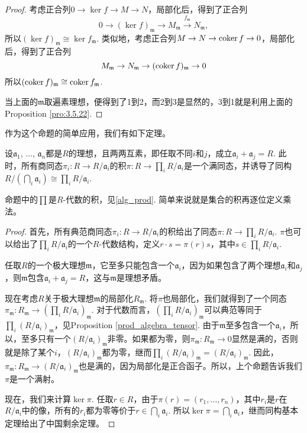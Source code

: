 \begin{proof}
	考虑正合列$0\to \ker f\to M\to N$，局部化后，得到了正合列
	\[
		0\to (\ker f)_{\mathfrak m}\to M_{\mathfrak m}\xrightarrow{f_{\mathfrak m}} N_{\mathfrak m},
	\]
	所以$(\ker f)_{\mathfrak m}\cong \ker f_{\mathfrak m}$. 类似地，考虑正合列$M\to N\to \operatorname{coker} f\to 0$，局部化后，得到了正合列
	\[
		M_{\mathfrak m}\to N_{\mathfrak m}\to (\operatorname{coker} f)_{\mathfrak m}\to 0
	\]
	所以$(\operatorname{coker} f)_{\mathfrak m}\cong \operatorname{coker} f_{\mathfrak m}$.

	当上面的$\mathfrak m$取遍素理想，便得到了1到2，而2到3是显然的，3到1就是利用上面的Proposition \ref{pro:3.5.22}.
\end{proof}

作为这个命题的简单应用，我们有如下定理。

\begin{thm}[中国剩余定理]
	设$\mathfrak a_1$, $\dots$, $\mathfrak a_n$都是$R$的理想，且两两互素，即任取不同$i$和$j$，成立$\mathfrak a_i+\mathfrak a_j=R$. 此时，所有商同态$\pi_i:R\to R/\mathfrak a_i$的积$\pi:R\to \prod_i R/\mathfrak a_i$是一个满同态，并诱导了同构$R/(\bigcap_i \mathfrak a_i)\cong \prod_i R/\mathfrak a_i$.
\end{thm}

命题中的$\prod$是$R$-代数的积，见\ref{alg_prod}. 简单来说就是集合的积再逐位定义乘法。

\begin{proof}
	首先，所有典范商同态$\pi_i:R\to R/\mathfrak a_i$的积给出了同态$\pi:R\to \prod_i R/\mathfrak a_i$. $\pi$也可以给出了$\prod_i R/\mathfrak a_i$的一个$R$-代数结构，定义$r\cdot s=\pi(r)s$，其中$s\in \prod_i R/\mathfrak a_i$. 

	任取$R$的一个极大理想$\mathfrak m$，它至多只能包含一个$\mathfrak a_i$，因为如果包含了两个理想$\mathfrak a_i$和$\mathfrak a_j$，则$\mathfrak m$包含$\mathfrak a_i+\mathfrak a_j=R$，这与$\mathfrak m$是理想矛盾。

	现在考虑$R$关于极大理想$\mathfrak m$的局部化$R_{\mathfrak m}$. 将$\pi$也局部化，我们就得到了一个同态$\pi_{\mathfrak m}:R_{\mathfrak m}\to \left(\prod_i R/\mathfrak a_i\right)_{\mathfrak m}$. 对于代数而言，$\left(\prod_i R/\mathfrak a_i\right)_{\mathfrak m}$可以典范等同于$\prod_i (R/\mathfrak a_i)_{\mathfrak m}$，见Proposition \ref{prod_algebra_tensor}. 由于$\mathfrak m$至多包含一个$\mathfrak a_i$，所以，至多只有一个$(R/\mathfrak a_i)_{\mathfrak m}$非零。如果都为零，则$\pi_{\mathfrak m}:R_{\mathfrak m}\to 0$显然是满的，否则就是除了某个$i$，$(R/\mathfrak a_i)_{\mathfrak m}$都为零，继而$\prod_i (R/\mathfrak a_i)_{\mathfrak m}=(R/\mathfrak a_i)_{\mathfrak m}$. 因此，$\pi_{\mathfrak m}:R_{\mathfrak m}\to (R/\mathfrak a_i)_{\mathfrak m}$也是满的，因为局部化是正合函子。所以，上个命题告诉我们$\pi$是一个满射。

	现在，我们来计算$\ker\pi$. 任取$r\in R$，由于$\pi(r)=(r_1,\dots,r_n)$，其中$r_i$是$r$在$R/\mathfrak a_i$中的像，所有的$r_i$都为零等价于$r\in \bigcap_i \mathfrak a_i$. 所以$\ker \pi =\bigcap_i \mathfrak a_i$，继而同构基本定理给出了中国剩余定理。
\end{proof}


